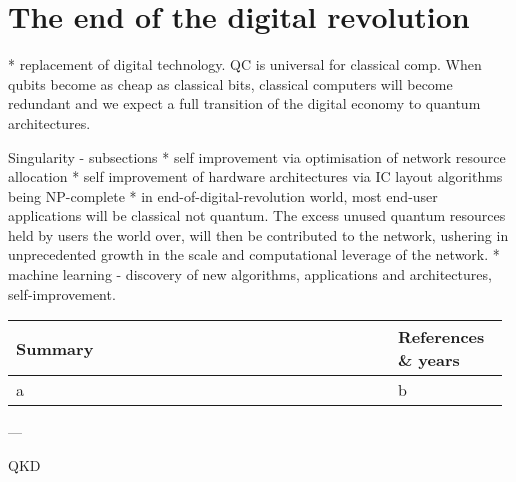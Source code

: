 \section{The end of the digital revolution}
	* replacement of digital technology. QC is universal for classical comp. When qubits become as cheap as classical bits, classical computers will become redundant and we expect a full transition of the digital economy to quantum architectures.

Singularity - subsections
	* self improvement via optimisation of network resource allocation
	* self improvement of hardware architectures via IC layout algorithms being NP-complete
	* in end-of-digital-revolution world, most end-user applications will be classical not quantum. The excess unused quantum resources held by users the world over, will then be contributed to the network, ushering in unprecedented growth in the scale and computational leverage of the network.
	* machine learning - discovery of new algorithms, applications and architectures, self-improvement.


\begin{table*}[!htb]
\caption{} \label{tab:}
\begin{tabular}{|p{0.755\linewidth}|p{0.22\linewidth}|}
	\hline
	Summary & References \& years \\
	\hline \hline
	a & b \\
\end{tabular}
\end{table*}

---

QKD



